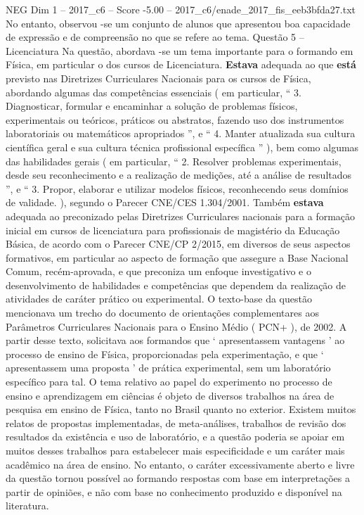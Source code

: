 \begin{textsample}{NEG Dim 1 – 2017\_c6 – Score -5.00 – 2017\_c6/enade\_2017\_fis\_eeb3bfda27.txt}
No entanto, observou -se um conjunto de alunos que apresentou boa capacidade de expressão e de compreensão no que se refere ao tema.
Questão 5 – Licenciatura Na questão, abordava -se um tema importante para o formando em Física, em particular o dos cursos de Licenciatura. \textbf{Estava} adequada ao que \textbf{está} previsto nas Diretrizes Curriculares Nacionais para os cursos de Física, abordando algumas das competências essenciais ( em particular, “ 3.
Diagnosticar, formular e encaminhar a solução de problemas físicos, experimentais ou teóricos, práticos ou abstratos, fazendo uso dos instrumentos laboratoriais ou matemáticos apropriados ”, e “ 4.
Manter atualizada sua cultura científica geral e sua cultura técnica profissional específica ” ), bem como algumas das habilidades gerais ( em particular, “ 2.
Resolver problemas experimentais, desde seu reconhecimento e a realização de medições, até a análise de resultados ”, e “ 3.
Propor, elaborar e utilizar modelos físicos, reconhecendo seus domínios de validade. ), segundo o Parecer CNE/CES 1.304/2001.
Também \textbf{estava} adequada ao preconizado pelas Diretrizes Curriculares nacionais para a formação inicial em cursos de licenciatura para profissionais de magistério da Educação Básica, de acordo com o Parecer CNE/CP 2/2015, em diversos de seus aspectos formativos, em particular ao aspecto de formação que assegure a Base Nacional Comum, recém-aprovada, e que preconiza um enfoque investigativo e o desenvolvimento de habilidades e competências que dependem da realização de atividades de caráter prático ou experimental.
O texto-base da questão mencionava um trecho do documento de orientações complementares aos Parâmetros Curriculares Nacionais para o Ensino Médio ( PCN+ ), de 2002.
A partir desse texto, solicitava aos formandos que ‘ apresentassem vantagens ’ ao processo de ensino de Física, proporcionadas pela experimentação, e que ‘ apresentassem uma proposta ’ de prática experimental, sem um laboratório específico para tal.
O tema relativo ao papel do experimento no processo de ensino e aprendizagem em ciências é objeto de diversos trabalhos na área de pesquisa em ensino de Física, tanto no Brasil quanto no exterior.
Existem muitos relatos de propostas implementadas, de meta-análises, trabalhos de revisão dos resultados da existência e uso de laboratório, e a questão poderia se apoiar em muitos desses trabalhos para estabelecer mais especificidade e um caráter mais acadêmico na área de ensino.
No entanto, o caráter excessivamente aberto e livre da questão tornou possível ao formando respostas com base em interpretações a partir de opiniões, e não com base no conhecimento produzido e disponível na literatura.

\end{textsample}
